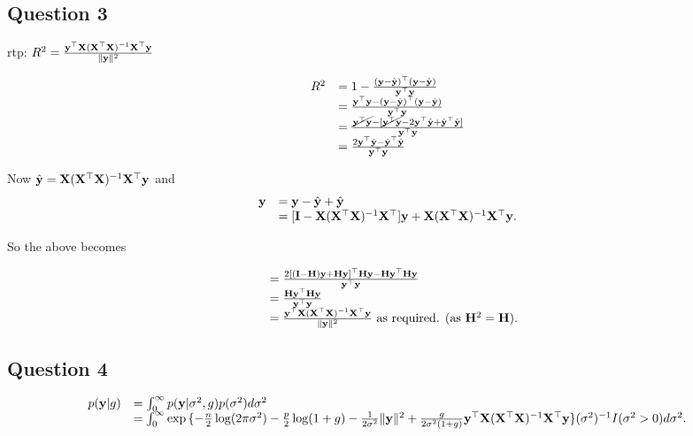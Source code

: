 \documentclass{amsart}[12pt]
\begin{document}
\subsection{Question 3}

rtp: $R^2 = \frac{{\bf y}^\top {\bf X} ({\bf X}^\top {\bf X})^{-1} {\bf X}^\top {\bf y}}{\| {\bf y} \|^2}$

\begin{equation*}
\begin{array}{ll}
R^2 &= 1 - \frac{({\bf y} - \hat{{\bf y}})^\top ({\bf y} - \hat{{\bf y}})}{{\bf y}^\top {\bf y}} \\
&= \frac{{\bf y}^\top {\bf y} - ({\bf y} - \hat{{\bf y}})^\top ({\bf y} - \hat{{\bf y}})}{{\bf y}^\top {\bf y}} \\
&= \frac{\cancel{{\bf y}^\top {\bf y}} - [\cancel{{\bf y}^\top {\bf y}} - 2 {\bf y}^\top \hat{{\bf y}} + \hat{{\bf y}}^\top \hat{{\bf y}}]}{{\bf y}^\top {\bf y}} \\
&= \frac{2 {\bf y}^\top \hat{{\bf y}} - \hat{{\bf y}}^\top \hat{{\bf y}}}{{\bf y}^\top {\bf y}}
\end{array}
\end{equation*}

Now $\hat{{\bf y}} = {\bf X} ({\bf X}^\top {\bf X})^{-1} {\bf X}^\top {\bf y}$ and
\begin{equation*}
\begin{array}{ll}
{\bf y} &= {\bf y} - \hat{{\bf y}} + \hat{{\bf y}} \\
&= [{\bf I} - {\bf X} ({\bf X}^\top {\bf X})^{-1} {\bf X}^\top] {\bf y} + {\bf X} ({\bf X}^\top {\bf X})^{-1} {\bf X}^\top {\bf y}.
\end{array}
\end{equation*}

So the above becomes

\begin{equation*}
\begin{array}{ll}
&= \frac{2[({\bf I} - {\bf H}) {\bf y} + {\bf H} {\bf y}]^\top {\bf H} {\bf y} - {\bf H} {\bf y}^\top {\bf H} {\bf y}}{{\bf y}^\top {\bf y}} \\
&= \frac{{\bf H} {\bf y}^\top {\bf H} {\bf y}}{{\bf y}^\top {\bf y}} \\
&= \frac{{\bf y}^\top {\bf X} ({\bf X}^\top {\bf X})^{-1} {\bf X}^\top {\bf y}}{\| {\bf y} \|^2} \text{ as required. } (\text{as } {\bf H}^2 = {\bf H}).
\end{array}
\end{equation*}

\subsection{Question 4}
\begin{equation*}
\begin{array}{ll}
p({\bf y} | g) &= \int_0^\infty p({\bf y} | \sigma^2, g) p(\sigma^2) d \sigma^2 \\
&= \int_0^\infty \exp{\{ -\frac{n}{2} \log (2 \pi \sigma^2) - \frac{p}{2} \log(1 + g)
	 - \frac{1}{2 \sigma^2} \| {\bf y}\|^2
	 + \frac{g}{2 \sigma^2 (1 + g)} {\bf y}^\top {\bf X}({\bf X}^\top {\bf X})^{-1} {\bf X}^\top {\bf y}\}}
	 (\sigma^2)^{-1} I(\sigma^2 > 0) d \sigma^2.
\end{array}
\end{equation*}
\end{document}
